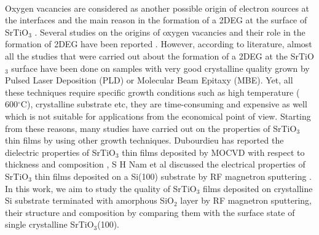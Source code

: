 \documentclass{aip-cp}
\begin{document}
\\Oxygen vacancies are considered as another possible origin of electron sources at the interfaces \cite{Eckstein,Zhong} and the main reason in the formation of a 2DEG at the surface of SrTiO$_{3}$ \cite{bib6,bib7}. Several studies on the origins of oxygen vacancies and their role in the formation of 2DEG have been reported \cite{bib3,bib8,bib9}. However, according to literature, almost all the studies that were carried out about the formation of a 2DEG at the SrTiO$_{3}$ surface have been done on samples with very good crystalline quality grown by Pulsed Laser Deposition (PLD) or Molecular Beam Epitaxy (MBE). Yet, all these techniques require specific growth conditions such as high temperature ( 600$^{\circ}$C), crystalline substrate etc, they are time-consuming and expensive as well which is not suitable for applications from the economical point of view.     
Starting from these reasons, many studies have carried out on the properties of SrTiO$_{3}$ thin films by using other growth techniques. Dubourdieu has reported the dielectric properties of SrTiO$_{3}$ thin films deposited by MOCVD with respect to thickness and composition \cite{bib10}, S H Nam et al discussed the electrical properties of SrTiO$_{3}$ thin films deposited on a Si(100) substrate by RF magnetron sputtering \cite{bib11}. 
\\In this work, we aim to study the quality of SrTiO$_{3}$ films deposited on crystalline Si substrate terminated with amorphous SiO$_{2}$ layer by RF magnetron sputtering, their structure and composition by comparing them with the surface state of single crystalline SrTiO$_{3}$(100).
\end{document}

